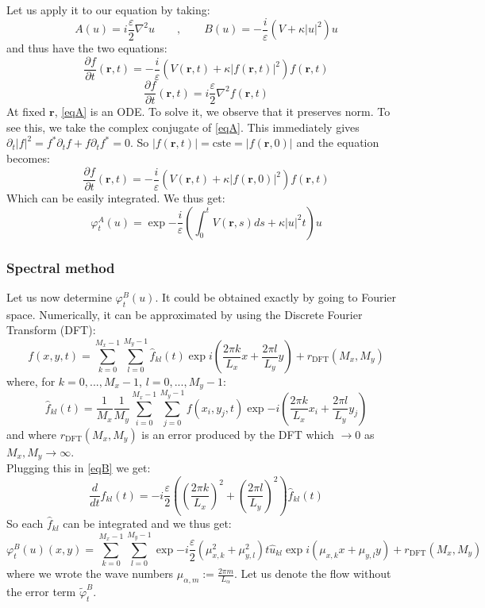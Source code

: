 \documentclass{article}
\begin{document}
\bigskip
Let us apply it to our equation by taking:
$$A(u)=i\frac{\varepsilon}{2} \nabla^{2} u \qquad,\qquad B(u)=-\frac{i}{\varepsilon}\left(V +\kappa|u|^{2}\right) u$$
and thus have the two equations:
\begin{equation}\label{eqA}
    \frac{\partial f}{\partial t}(\mathbf{r},t)=-\frac{i}{\varepsilon}\left(V(\mathbf{r},t) +\kappa|f(\mathbf{r},t)|^{2}\right) f(\mathbf{r},t)
\end{equation}
\begin{equation}\label{eqB}
    \frac{\partial f}{\partial t}(\mathbf{r},t)=i\frac{\varepsilon}{2} \nabla^{2} f(\mathbf{r},t)
\end{equation}
At fixed $\mathbf{r}$, \eqref{eqA} is an ODE. To solve it, we observe that it preserves norm. To see this, we take the complex conjugate of \eqref{eqA}. This immediately gives $\partial_t|f|^2=f^*\partial_t f+f\partial_t f^*=0$. So $|f(\mathbf{r},t)|=\text{cste}=|f(\mathbf{r},0)|$ and the equation becomes:
$$
\frac{\partial f}{\partial t}(\mathbf{r},t)=-\frac{i}{\varepsilon}\left(V(\mathbf{r},t) +\kappa|f(\mathbf{r},0)|^{2}\right) f(\mathbf{r},t)
$$
Which can be easily integrated. We thus get:
\begin{equation}\label{eq:phiA}
    \varphi^A_t(u)=\exp{-\frac{i}{\varepsilon}\left(\int_0^t V(\mathbf{r},s)ds +\kappa|u|^{2}t\right)}u
\end{equation}

\subsubsection*{Spectral method}
Let us now determine $\varphi^B_t(u)$. It could be obtained exactly by going to Fourier space. Numerically, it can be approximated by using the Discrete Fourier Transform (DFT):
$$
f(x,y,t)=\sum_{k=0}^{M_x-1}\sum_{l=0}^{M_y-1}\hat{f}_{kl}(t)\exp{i\left(\frac{2\pi k}{L_x}x+\frac{2\pi l}{L_y}y\right)}+r_\text{DFT}(M_x,M_y)
$$
where, for $k=0,..., M_x-1$, $l=0,..., M_y-1$:
$$
\hat{f}_{kl}(t)=\frac{1}{M_x}\frac{1}{M_y}\sum_{i=0}^{M_x-1}\sum_{j=0}^{M_y-1}f(x_i,y_j,t)\exp{-i\left(\frac{2\pi k}{L_x}x_i+\frac{2\pi l}{L_y}y_j\right)}
$$
and where $r_\text{DFT}(M_x,M_y)$ is an error produced by the DFT which $\longrightarrow0$ as $M_x,M_y\longrightarrow\infty$.\\
Plugging this in \eqref{eqB} we get:
$$
\frac{d}{dt}\hat{f}_{kl}(t)=-i\frac{\varepsilon}{2}\left(\left(\frac{2\pi k}{L_x}\right)^2+\left(\frac{2\pi l}{L_y}\right)^2\right)\hat{f}_{kl}(t)
$$
So each $\hat{f}_{kl}$ can be integrated and we thus get:
\begin{equation}\label{eq:phiB}
    \varphi^B_t(u)(x,y)=\sum_{k=0}^{M_x-1}\sum_{l=0}^{M_y-1}\exp{-i\frac{\varepsilon}{2}\left(\mu_{x,k}^2+\mu_{y,l}^2\right)t}\hat{u}_{kl}\exp{i\left(\mu_{x,k} x+\mu_{y,l} y\right)}+r_\text{DFT}(M_x,M_y)
\end{equation}
where we wrote the wave numbers $\mu_{\alpha,m}:=\frac{2\pi m}{L_\alpha}$. Let us denote the flow without the error term $\tilde{\varphi}_t^B$.
\end{document}
